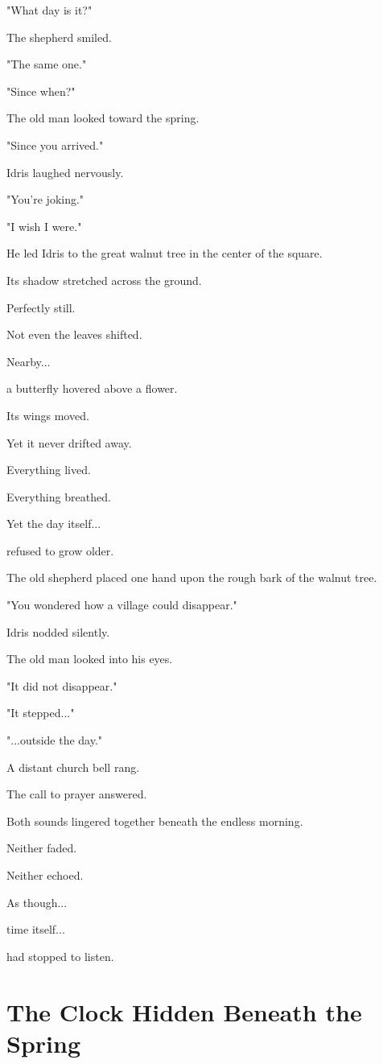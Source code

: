 \documentclass[12pt,openany]{book}
\begin{document}
"What day is it?"

The shepherd smiled.

"The same one."

"Since when?"

The old man looked toward the spring.

"Since you arrived."

Idris laughed nervously.

"You're joking."

"I wish I were."

He led Idris to the great walnut tree in the center of the square.

Its shadow stretched across the ground.

Perfectly still.

Not even the leaves shifted.

Nearby...

a butterfly hovered above a flower.

Its wings moved.

Yet it never drifted away.

Everything lived.

Everything breathed.

Yet the day itself...

refused to grow older.

The old shepherd placed one hand upon the rough bark of the walnut tree.

"You wondered how a village could disappear."

Idris nodded silently.

The old man looked into his eyes.

"It did not disappear."

"It stepped..."

"...outside the day."

A distant church bell rang.

The call to prayer answered.

Both sounds lingered together beneath the endless morning.

Neither faded.

Neither echoed.

As though...

time itself...

had stopped to listen.
\section*{The Clock Hidden Beneath the Spring}
\end{document}
